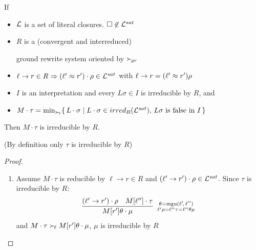 \documentclass[%
handout,
]{beamer}
\begin{document}
\begin{frame}[allowframebreaks]
    \begin{lemma}
        \vspace{0.7em}

        If
        \begin{itemize}
            \item $\mathcal{L}$ is a set of literal closures. $\square\not\in\mathcal{L}^{sat}$

            \item $R$ is a (convergent and interreduced)

            ground rewrite system oriented by $\mathrel\succ_{\!gr}$

            \item
            $\ell\to r\in R
            \Rightarrow
            (\ell'\approx r')\cdot\rho \in \mathcal{L}^{sat}$
            with
            $\ell\to r = (\ell'\approx r')\rho$

            \item $I$ is an interpretation and every $L\sigma\in I$
            is irreducible by $R$, and

            \item
            $M\cdot\tau = \min_{\mathrel\succ_{\!\ell}}\!
            \left\{\,
            L\cdot\sigma \mid
            L\cdot\sigma \in irred_{R}(\mathcal{L}^{sat}),\,
            L\sigma\text{ is false in }I\,
            \right\}
            $
\end{itemize}
Then $M\cdot\tau$ is irreducible by $R$.
\vspace{0.7em}

(By definition only $\tau$ is irreducible by $R$)
\end{lemma}

    \framebreak
    \begin{proof}
        \begin{enumerate}
            \item
        Assume $M\cdot\tau$ is reducible by
        $\ell\to r\in R$ and $(\ell'\to r')\cdot\rho\in\mathcal{L}^{sat}$.
        Since $\tau$ is irreducible by $R$:
        \begin{gather*}
            \infer[
                {\theta = \mgu(\ell'\!,\,\ell'')}
                \atop
                {\ell'\rho = \ell''\tau = \ell''\theta\mu}
                ]
            {M[r']\theta\cdot\mu}
            {(\ell'\to r')\cdot\rho & M[\ell'']\cdot\tau}
        \end{gather*}
        and $M\cdot\tau\mathrel\succ_{\!\ell} M[r']\theta\cdot\mu$, $\mu$ is irreducible by $R$


\end{enumerate}
\end{proof}
\end{frame}
\end{document}

